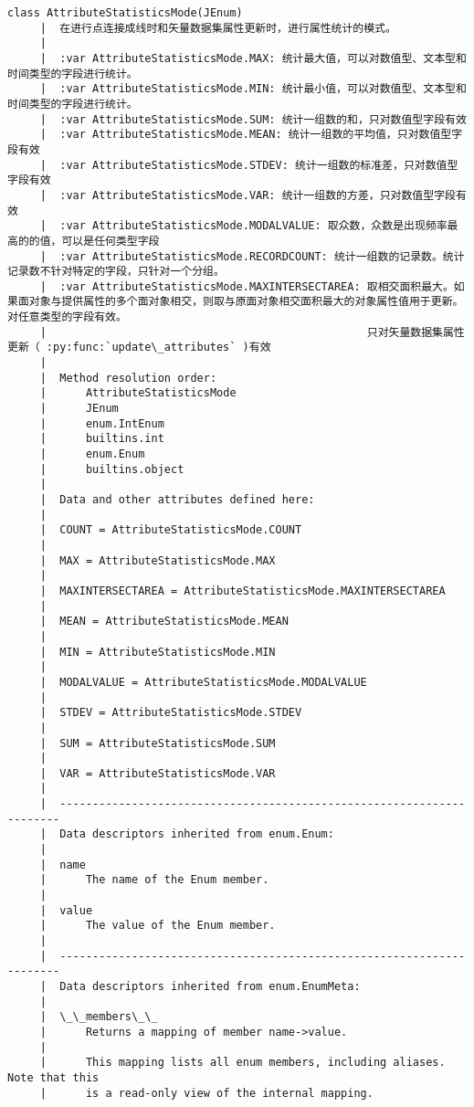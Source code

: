 \documentclass[11pt]{article}
\begin{document}
\begin{Verbatim}[commandchars=\\\{\}]
    class AttributeStatisticsMode(JEnum)
     |  在进行点连接成线时和矢量数据集属性更新时，进行属性统计的模式。
     |  
     |  :var AttributeStatisticsMode.MAX: 统计最大值，可以对数值型、文本型和时间类型的字段进行统计。
     |  :var AttributeStatisticsMode.MIN: 统计最小值，可以对数值型、文本型和时间类型的字段进行统计。
     |  :var AttributeStatisticsMode.SUM: 统计一组数的和，只对数值型字段有效
     |  :var AttributeStatisticsMode.MEAN: 统计一组数的平均值，只对数值型字段有效
     |  :var AttributeStatisticsMode.STDEV: 统计一组数的标准差，只对数值型字段有效
     |  :var AttributeStatisticsMode.VAR: 统计一组数的方差，只对数值型字段有效
     |  :var AttributeStatisticsMode.MODALVALUE: 取众数，众数是出现频率最高的的值，可以是任何类型字段
     |  :var AttributeStatisticsMode.RECORDCOUNT: 统计一组数的记录数。统计记录数不针对特定的字段，只针对一个分组。
     |  :var AttributeStatisticsMode.MAXINTERSECTAREA: 取相交面积最大。如果面对象与提供属性的多个面对象相交，则取与原面对象相交面积最大的对象属性值用于更新。对任意类型的字段有效。
     |                                                 只对矢量数据集属性更新（ :py:func:`update\_attributes` )有效
     |  
     |  Method resolution order:
     |      AttributeStatisticsMode
     |      JEnum
     |      enum.IntEnum
     |      builtins.int
     |      enum.Enum
     |      builtins.object
     |  
     |  Data and other attributes defined here:
     |  
     |  COUNT = AttributeStatisticsMode.COUNT
     |  
     |  MAX = AttributeStatisticsMode.MAX
     |  
     |  MAXINTERSECTAREA = AttributeStatisticsMode.MAXINTERSECTAREA
     |  
     |  MEAN = AttributeStatisticsMode.MEAN
     |  
     |  MIN = AttributeStatisticsMode.MIN
     |  
     |  MODALVALUE = AttributeStatisticsMode.MODALVALUE
     |  
     |  STDEV = AttributeStatisticsMode.STDEV
     |  
     |  SUM = AttributeStatisticsMode.SUM
     |  
     |  VAR = AttributeStatisticsMode.VAR
     |  
     |  ----------------------------------------------------------------------
     |  Data descriptors inherited from enum.Enum:
     |  
     |  name
     |      The name of the Enum member.
     |  
     |  value
     |      The value of the Enum member.
     |  
     |  ----------------------------------------------------------------------
     |  Data descriptors inherited from enum.EnumMeta:
     |  
     |  \_\_members\_\_
     |      Returns a mapping of member name->value.
     |      
     |      This mapping lists all enum members, including aliases. Note that this
     |      is a read-only view of the internal mapping.
    

\end{Verbatim}
\end{document}
